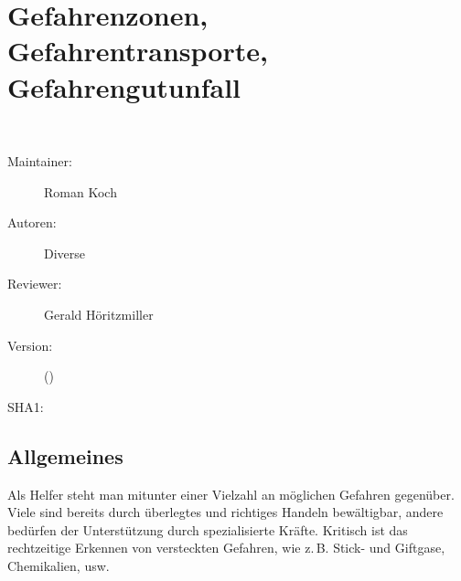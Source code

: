 \def\ChapterCode{GEF}
\chapter
[\CO{[GEF]} Gefahrenzonen, Gefahrentransporte, Gefahrengutunfall]
{Gefahrenzonen, \\Gefahrentransporte,
\\Gefahrengutunfall}
\label{topic:gefahrengutunfall}

\ChapterIntro
{%
~~~
}
{%
\begin{description}
  \item[Maintainer:] Roman Koch
  \item[Autoren:] Diverse
  \item[Reviewer:] Gerald Höritzmiller
  \item[Version:] {\VarDocVersionTypeName} ({\VarDocVersionTypeDescription})
  \item[SHA1:] {\DocGitCommit}
\end{description}

{\TxTeilkapitelAASS}
}




\clearpage

\section{Allgemeines}

Als Helfer steht man mitunter einer Vielzahl an möglichen
Gefahren gegenüber. Viele sind bereits durch überlegtes und
richtiges Handeln bewältigbar, andere bedürfen der
Unterstützung durch spezialisierte Kräfte. Kritisch ist das
rechtzeitige Erkennen von versteckten Gefahren, wie z.\,B.
Stick- und Giftgase, Chemikalien, usw.



